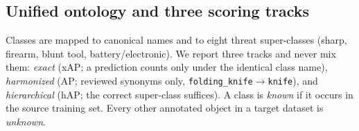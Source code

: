 \documentclass[10pt,twocolumn,letterpaper]{article}
\begin{document}
\begin{table}[t]
\centering\small\setlength{\tabcolsep}{3pt}
\caption{Images per split after the leakage audit (``excl.'': evaluation images removed as duplicates of training images). PIDray test subsets: 9{,}455 easy, 3{,}731 hard, 5{,}005 hidden. $^\dagger$Five-class mirror split, one image per original ID.}
\label{tab:data}
\end{table}

\subsection{Unified ontology and three scoring tracks}
Classes are mapped to canonical names and to eight threat super-classes (\eg sharp, firearm, blunt tool, battery/electronic). We report three tracks and never mix them:
\emph{exact} (xAP; a prediction counts only under the identical class name),
\emph{harmonized} (AP; reviewed synonyms only, \eg \texttt{folding\_knife}$\rightarrow$\texttt{knife}), and
\emph{hierarchical} (hAP; the correct super-class suffices).
A class is \emph{known} if it occurs in the source training set. Every other annotated object in a target dataset is \emph{unknown}.
\end{document}
